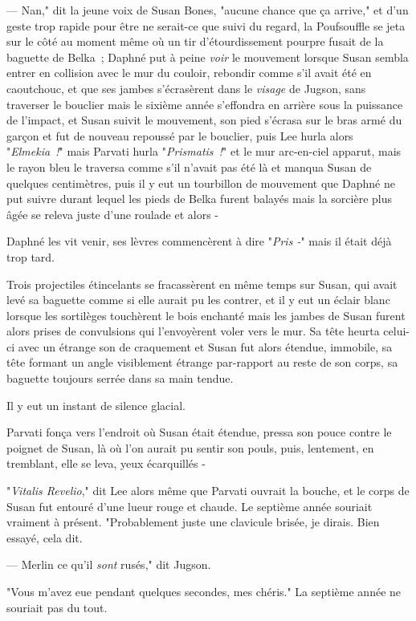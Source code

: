 --- Nan," dit la jeune voix de Susan Bones, "aucune chance que ça arrive," et d'un geste trop rapide pour être ne serait-ce que suivi du regard, la Poufsouffle se jeta sur le côté au moment même où un tir d'étourdissement pourpre fusait de la baguette de Belka~; Daphné put à peine \emph{voir} le mouvement lorsque Susan sembla entrer en collision avec le mur du couloir, rebondir comme s'il avait été en caoutchouc, et que ses jambes s'écrasèrent dans le \emph{visage} de Jugson, sans traverser le bouclier mais le sixième année s'effondra en arrière sous la puissance de l'impact, et Susan suivit le mouvement, son pied s'écrasa sur le bras armé du garçon et fut de nouveau repoussé par le bouclier, puis Lee hurla alors "\emph{Elmekia~!}" mais Parvati hurla "\emph{Prismatis~!}" et le mur arc-en-ciel apparut, mais le rayon bleu le traversa comme s'il n'avait pas été là et manqua Susan de quelques centimètres, puis il y eut un tourbillon de mouvement que Daphné ne put suivre durant lequel les pieds de Belka furent balayés mais la sorcière plus âgée se releva juste d'une roulade et alors -

Daphné les vit venir, ses lèvres commencèrent à dire "\emph{Pris -}" mais il était déjà trop tard.

Trois projectiles étincelants se fracassèrent en même temps sur Susan, qui avait levé sa baguette comme si elle aurait pu les contrer, et il y eut un éclair blanc lorsque les sortilèges touchèrent le bois enchanté mais les jambes de Susan furent alors prises de convulsions qui l'envoyèrent voler vers le mur. Sa tête heurta celui-ci avec un étrange son de craquement et Susan fut alors étendue, immobile, sa tête formant un angle visiblement étrange par-rapport au reste de son corps, sa baguette toujours serrée dans sa main tendue.

Il y eut un instant de silence glacial.

Parvati fonça vers l'endroit où Susan était étendue, pressa son pouce contre le poignet de Susan, là où l'on aurait pu sentir son pouls, puis, lentement, en tremblant, elle se leva, yeux écarquillés -

"\emph{Vitalis Revelio}," dit Lee alors même que Parvati ouvrait la bouche, et le corps de Susan fut entouré d'une lueur rouge et chaude. Le septième année souriait vraiment à présent. "Probablement juste une clavicule brisée, je dirais. Bien essayé, cela dit.

--- Merlin ce qu'il \emph{sont} rusés," dit Jugson.

"Vous m'avez eue pendant quelques secondes, mes chéris." La septième année ne souriait pas du tout.

